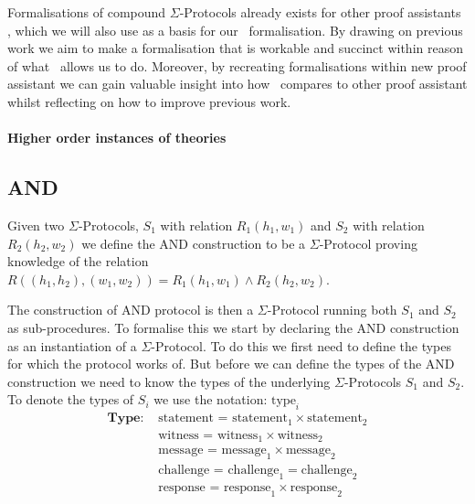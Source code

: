 Formalisations of compound $\Sigma$-Protocols already exists for other proof
assistants \cite{cryptoeprint:2019:1185,certicrypt_sigma}, which we will also
use as a basis for our \easycrypt\ formalisation. By drawing on previous work we
aim to make a formalisation that is workable and succinct within reason of what
\easycrypt\ allows us to do. Moreover, by recreating formalisations within new
proof assistant we can gain valuable insight into how \easycrypt\ compares to
other proof assistant whilst reflecting on how to improve previous work.

\paragraph{Higher order instances of theories} 

\subsection{AND}
\label{subsec:sigma_AND}
Given two $\Sigma$-Protocols, $S_{1}$ with relation $R_{1}(h_{1},w_{1})$ and
$S_{2}$ with relation $R_{2}(h_{2},w_{2})$ we define the AND construction to be a
$\Sigma$-Protocol proving knowledge of the relation
$R((h_{1}, h_{2}), (w_{1}, w_{2})) = R_{1}(h_{1}, w_{1}) \land R_{2}(h_{2}, w_{2})$.

The construction of AND protocol is then a $\Sigma$-Protocol running both
$S_{1}$ and $S_{2}$ as sub-procedures. To formalise this we start by declaring
the AND construction as an instantiation of a $\Sigma$-Protocol. To do this we
first need to define the types for which the protocol works of. But before we
can define the types of the AND construction we need to know the types of the
underlying $\Sigma$-Protocols $S_{1}$ and $S_{2}$. To denote the types of
$S_{i}$ we use the notation: $\text{type}_i$
\begin{align*}
  \textbf{Type: } &\text{statement = statement}_{1} \times \text{statement}_{2} \\
                  &\text{witness = witness}_{1} \times \text{witness}_{2} \\
                  &\text{message = message}_{1} \times \text{message}_{2} \\
                  &\text{challenge = challenge}_{1} = \text{challenge}_{2} \\
                  &\text{response = response}_{1} \times \text{response}_{2} \\
\end{align*}

